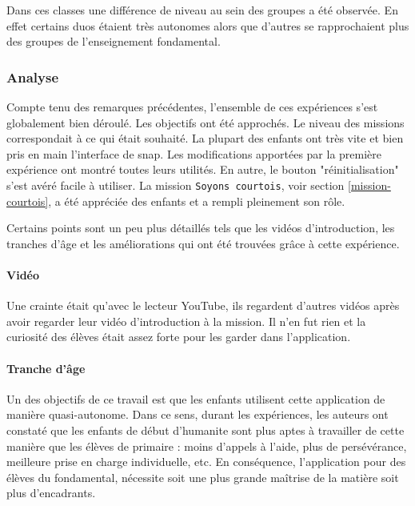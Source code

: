 Dans ces classes une différence de niveau au sein des groupes a été observée. En effet certains duos étaient très autonomes alors que d'autres se rapprochaient plus des groupes de l'enseignement \gls{fondamental}.

\subsubsection{Analyse}
\label{analyse-scienceinfuse}
Compte tenu des remarques précédentes, l'ensemble de ces expériences s'est globalement bien déroulé. Les objectifs ont été approchés. Le niveau des \glspl{mission} correspondait à ce qui était souhaité. La plupart des enfants ont très vite et bien pris en main l'interface de \gls{snap}. Les modifications apportées par la première expérience ont montré toutes leurs utilités. En autre, le bouton "réinitialisation" s'est avéré facile à utiliser. La \gls{mission} \texttt{Soyons courtois}, voir section \ref{mission-courtois}, a été appréciée des enfants et a rempli pleinement son rôle.

Certains points sont un peu plus détaillés tels que les vidéos d'introduction, les tranches d'âge et les améliorations qui ont été trouvées grâce à cette expérience.

\paragraph{Vidéo}
Une crainte était qu'avec le lecteur YouTube, ils regardent d'autres vidéos après avoir regarder leur vidéo d'introduction à la \gls{mission}. Il n'en fut rien et la curiosité des élèves était assez forte pour les garder dans l'application.

\paragraph{Tranche d'âge}
\label{trancheage}
Un des objectifs de ce travail est que les enfants utilisent cette application de manière quasi-autonome. Dans ce sens, durant les expériences, les auteurs ont constaté que les enfants de début d'\gls{humanite} sont plus aptes à travailler de cette manière que les élèves de \gls{primaire} : moins d'appels à l'aide, plus de persévérance, meilleure prise en charge individuelle, etc.
En conséquence, l'application pour des élèves du \gls{fondamental}, nécessite soit une plus grande maîtrise de la matière soit plus d'encadrants.

